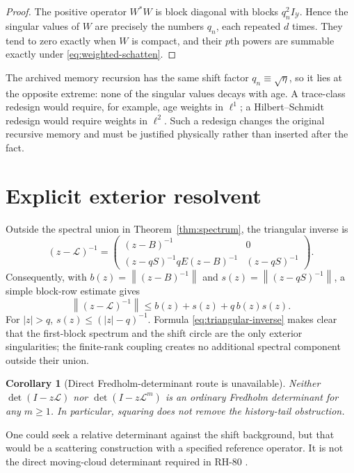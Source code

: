 \documentclass[12pt]{article}
\newtheorem{corollary}[theorem]{Corollary}
\theoremstyle{remark}
\newcommand{\cY}{\mathcal Y}
\newcommand{\norm}[1]{\left\lVert#1\right\rVert}
\begin{document}
\begin{proof}
The positive operator $W^*W$ is block diagonal with blocks $q_n^2I_\cY$.
Hence the singular values of $W$ are precisely the numbers $q_n$, each
repeated $d$ times.  They tend to zero exactly when $W$ is compact, and their
$p$th powers are summable exactly under \eqref{eq:weighted-schatten}.
\end{proof}

The archived memory recursion has the same shift factor
$q_n\equiv\sqrt\eta$, so it lies at the opposite extreme: none of the
singular values decays with age.  A trace-class redesign would require, for
example, age weights in $\ell^1$; a Hilbert--Schmidt redesign would require
weights in $\ell^2$.  Such a redesign changes the original recursive memory
and must be justified physically rather than inserted after the fact.

\section{Explicit exterior resolvent}

Outside the spectral union in Theorem~\ref{thm:spectrum}, the triangular
inverse is
\begin{equation}\label{eq:triangular-inverse}
 (z-\mathcal L)^{-1}=
 \begin{pmatrix}
 (z-B)^{-1}&0\\
 (z-qS)^{-1}qE(z-B)^{-1}&(z-qS)^{-1}
 \end{pmatrix}.
\end{equation}
Consequently, with
$b(z)=\norm{(z-B)^{-1}}$ and
$s(z)=\norm{(z-qS)^{-1}}$, a simple block-row estimate gives
\begin{equation}\label{eq:exterior-bound}
 \norm{(z-\mathcal L)^{-1}}
 \le b(z)+s(z)+q\,b(z)s(z).
\end{equation}
For $|z|>q$, $s(z)\le(|z|-q)^{-1}$.  Formula
\eqref{eq:triangular-inverse} makes clear that the first-block spectrum and
the shift circle are the only exterior singularities; the finite-rank coupling
creates no additional spectral component outside their union.

\begin{corollary}[Direct Fredholm-determinant route is unavailable]
Neither $\det(I-z\mathcal L)$ nor $\det(I-z\mathcal L^m)$ is an ordinary
Fredholm determinant for any $m\ge1$.  In particular, squaring does not remove
the history-tail obstruction.
\end{corollary}

One could seek a relative determinant against the shift background, but that
would be a scattering construction with a specified reference operator.  It
is not the direct moving-cloud determinant required in RH-80
\citep{WangRH80}.
\end{document}
